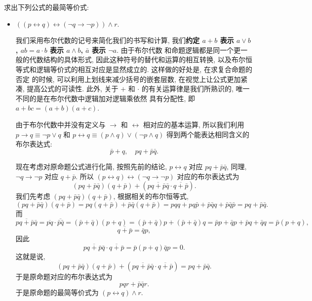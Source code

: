 \documentclass[10pt,UTF8]{ctexbook} %
\begin{document}
\begin{exercise}
    求出下列公式的最简等价式:
    \begin{itemize}[itemsep=0pt]
        \item $((p \leftrightarrow q) \leftrightarrow (\lnot q \to \lnot p))\wedge r$.
        \begin{sol}
            我们采用布尔代数的记号来简化我们的书写和计算, 我们\textbf{约定 $a+b$ 表示 $a \vee b$,
            $ab = a \cdot b$ 表示 $a \wedge b$, $\bar a$ 表示 $\lnot a$}. 由于布尔代数
            和命题逻辑都是同一个更一般的代数结构的具体形式, 因此这种符号的替代和运算的相互转换,
            以及布尔恒等式和逻辑等价式的相互对应是显然成立的. 这样做的好处是, 在求复合命题的否定
            的时候, 可以利用上划线来减少括号的嵌套层数, 在视觉上让公式更加紧凑, 提高公式的可读性. 此外, 关于 $+$
            和 $\cdot$ 的有关运算律是我们所熟识的, 唯一不同的是在布尔代数中逻辑加对逻辑乘依然
            具有分配性, 即 $a + bc = (a+b)(a+c)$.

            由于布尔代数中并没有定义与 $\to$ 和 $\leftrightarrow$ 相对应的基本运算,
            所以我们利用 $p \to q \equiv \lnot p \vee q$ 和
            $p \leftrightarrow q \equiv (p \wedge q)\vee(\lnot p \wedge q)$
            得到两个能表达相同含义的布尔表达式:
            \[ \bar p + q, \quad pq+\bar p \bar q. \]

            现在考虑对原命题公式进行化简, 按照先前的结论, $p \leftrightarrow q$ 对应
            $pq+\bar p \bar q$, 同理, $\lnot q \to \lnot p$ 对应
            $q + \bar p$.
            所以 $(p \leftrightarrow q) \leftrightarrow (\lnot q \to \lnot p)$ 
            对应的布尔表达式为
            \[ (pq + \bar p \bar q)(q + \bar p) + \left(\overline{pq + \bar p \bar q}
            \cdot \overline{q + \bar p}\right). \]
            我们先考虑 $(pq + \bar p \bar q)(q + \bar p)$,
            根据相关的布尔恒等式,
            \[ (pq + \bar p \bar q)(q + \bar p) 
            = pq(q + \bar p) + \bar p \bar q (q + \bar p)
            = pqq + pq\bar p + \bar p \bar q q + \bar p \bar q \bar p 
            = pq + \bar p \bar q. \]
            而
            \[ \overline{pq + \bar p \bar q}
            = \overline{pq} \cdot \overline{\bar p \bar q}
            = (\bar p + \bar q) (p + q)
            =(\bar p + \bar q)p + (\bar p + \bar q) q 
            = \bar p p + \bar q p + \bar p q + \bar q q 
            = \bar p(p+q), \]
            \[ \overline{q + \bar p} = \bar q p, \]
            因此 \[ \overline{pq + \bar p \bar q}
            \cdot \overline{q + \bar p} = \bar p (p+q) \bar q p = 0. \]
            这就是说,
            \[ (pq + \bar p \bar q)(q + \bar p) + \left(\overline{pq + \bar p \bar q}
            \cdot \overline{q + \bar p}\right) = pq + \bar p \bar q. \]
            于是原命题对应的布尔表达式为
            \[ pqr + \bar p \bar q r. \]
            于是原命题的最简等价式为 $(p \leftrightarrow q) \wedge r$.
        \end{sol}


\end{itemize}
\end{exercise}
\end{document}
